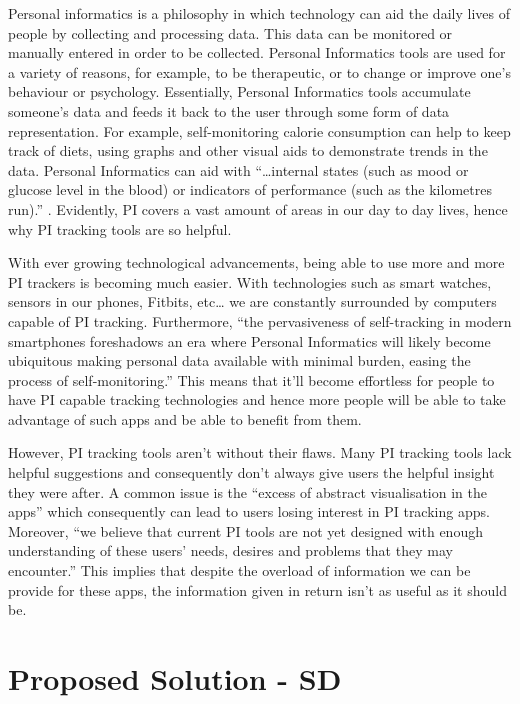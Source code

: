 \documentclass[10pt, notitlepage]{report}
\begin{document}
Personal informatics is a philosophy in which technology can aid the daily lives of people by collecting and processing data. This data can be monitored or manually entered in order to be collected. Personal Informatics tools are used for a variety of reasons, for example, to be therapeutic, or to change or improve one’s behaviour or psychology. Essentially, Personal Informatics tools accumulate someone’s data and feeds it back to the user through some form of data representation. For example, self-monitoring calorie consumption can help to keep track of diets, using graphs and other visual aids to demonstrate trends in the data. Personal Informatics can aid with “…internal states (such as mood or glucose level in the blood) or indicators of performance (such as the kilometres run).”  \cite{Rapp2014a} . Evidently, PI covers a vast amount of areas in our day to day lives, hence why PI tracking tools are so helpful.

With ever growing technological advancements, being able to use more and more PI trackers is becoming much easier. With technologies such as smart watches, sensors in our phones, Fitbits, etc… we are constantly surrounded by computers capable of PI tracking. Furthermore, “the pervasiveness of self-tracking in modern smartphones foreshadows an era where Personal Informatics will likely become ubiquitous making personal data available with minimal burden, easing the process of self-monitoring.” This means that it’ll become effortless for people to have PI capable tracking technologies and hence more people will be able to take advantage of such apps and be able to benefit from them.\cite{Rapp2016}

However, PI tracking tools aren’t without their flaws. Many PI tracking tools lack helpful suggestions and consequently don’t always give users the helpful insight they were after. A common issue is the “excess of abstract visualisation in the apps” \cite{Rapp2016} which consequently can lead to users losing interest in PI tracking apps. Moreover, “we believe that current PI tools are not yet designed with enough understanding of these users’ needs, desires and problems that they may encounter.” \cite{Rapp2016} This implies that despite the overload of information we can be provide for these apps, the information given in return isn’t as useful as it should be.


\section{Proposed Solution - SD}
\end{document}
